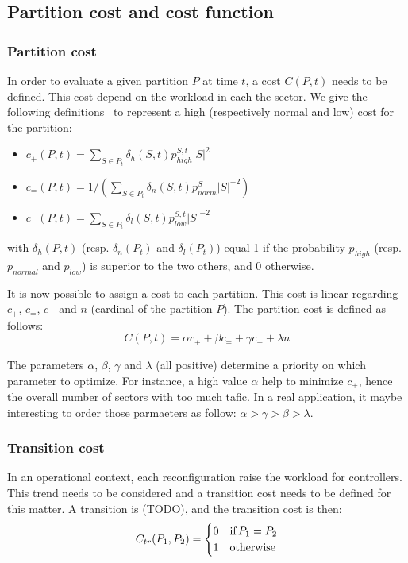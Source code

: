 \documentclass[oneside,twocolumn]{article}
\begin{document}
\subsection{Partition cost and cost function}

\subsubsection{Partition cost}

In order to evaluate a given partition $P$ at time $t$, a cost $C(P, t)$ needs
to be defined. This cost depend on the workload in each the sector. We give the
following definitions~\cite{ferrari2017} to represent a high
(respectively normal and low) cost for the partition:
\begin{itemize}
  \item $c_+(P, t) = \sum_{S \in P_t} \delta_{h}(S, t) p_{high}^{S, t} |S|^2$
  \item $c_=(P, t) = 1 / \left(
      \sum_{S \in P_t} \delta_{n}(S, t) p_{norm}^{S} |S|^{-2}
    \right)$
  \item $c_-(P, t) = \sum_{S \in P_t} \delta_{l}(S, t) p_{low}^{S, t} |S|^{-2}$
\end{itemize}
with $\delta_{h}(P, t)$ (resp. $\delta_{n}(P_t)$ and $\delta_{l}(P_t)$) equal 1
if the probability $p_{high}$ (resp. $p_{normal}$ and $p_{low}$) is superior to
the two others, and 0 otherwise.

It is now possible to assign a cost to each partition. This cost is linear
regarding $c_+$, $c_=$, $c_-$ and $n$ (cardinal of the partition $P$). The
partition cost is defined as follows:
\begin{equation}
  C(P, t) = \alpha c_+ + \beta c_= + \gamma c_- +\lambda n
\end{equation}

The parameters $\alpha$, $\beta$, $\gamma$ and $\lambda$ (all positive)
determine a priority on which parameter to optimize. For instance, a high
value $\alpha$ help to
minimize $c_+$, hence the overall number of sectors with too much tafic.
In a real application, it maybe interesting to order those parmaeters as
follow: $\alpha > \gamma > \beta > \lambda$.

\subsubsection{Transition cost}

In an operational context, each reconfiguration raise the workload for
controllers. This trend needs to be considered and a transition cost needs to
be defined for this matter. A transition is (TODO), and the transition cost is
then:
\begin{equation}
  C_{tr}(P_1, P_2) =
  \begin{cases}
    0 & \text{if\,} P_1 = P_2\\
    1 & \text{otherwise}
  \end{cases}
\end{equation}
\end{document}
